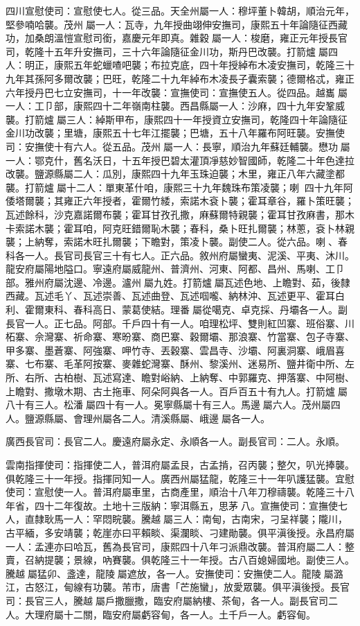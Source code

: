 \begin{pinyinscope}
四川宣慰使司：宣慰使七人。從三品。天全州屬一人：穆坪董卜韓胡，順治元年，堅參喃哈襲。茂州屬一人：瓦寺，九年授曲翊伸安撫司，康熙五十年論隨征西藏功，加桑朗溫愷宣慰司銜，嘉慶元年即真。雜穀屬一人：梭磨，雍正元年授長官司，乾隆十五年升安撫司，三十六年論隨征金川功，斯丹巴改襲。打箭爐屬四人：明正，康熙五年蛇蠟喳吧襲；布拉克底，四十年授綽布木凌安撫司，乾隆三十九年其孫阿多爾改襲；巴旺，乾隆二十九年綽布木凌長子囊索襲；德爾格忒，雍正六年授丹巴七立安撫司，十一年改襲：宣撫使司：宣撫使五人。從四品。越巂屬一人：工⼙部，康熙四十二年嶺南柱襲。西昌縣屬一人：沙麻，四十九年安鞏威襲。打箭爐屬三人：綽斯甲布，康熙四十一年授資立安撫司，乾隆四十年論隨征金川功改襲；里塘，康熙五十七年江擺襲；巴塘，五十八年羅布阿旺襲。安撫使司：安撫使十有六人。從五品。茂州屬一人：長寧，順治九年蘇廷輔襲。懋功屬一人：鄂克什，舊名沃日，十五年授巴碧太灌頂凈慈妙智國師，乾隆二十年色達拉改襲。鹽源縣屬二人：瓜別，康熙四十九年玉珠迫襲；木里，雍正八年六藏塗都襲。打箭爐屬十二人：單東革什咱，康熙三十九年魏珠布策凌襲；喇，四十九年阿倭塔爾襲；其雍正六年授者，霍爾竹緌，索諾木袞卜襲；霍耳章谷，羅卜策旺襲；瓦述餘科，沙克嘉諾爾布襲；霍耳甘孜孔撒，麻蘇爾特親襲；霍耳甘孜麻書，那木卡索諾木襲；霍耳咱，阿克旺錯爾恥木襲；春科，桑卜旺扎爾襲；林蔥，袞卜林親襲；上納奪，索諾木旺扎爾襲；下瞻對，策凌卜襲。副使二人。從六品。喇、春科各一人。長官司長官三十有七人。正六品。敘州府屬蠻夷、泥溪、平夷、沐川。龍安府屬陽地隘口。寧遠府屬威龍州、普濟州、河東、阿都、昌州、馬喇、工⼙部。雅州府屬沈邊、冷邊。瀘州屬九姓。打箭爐屬瓦述色地、上瞻對、茹，後隸西藏。瓦述毛丫、瓦述崇善、瓦述曲登、瓦述啯嚨、納林沖、瓦述更平、霍耳白利、霍爾東科、春科高日、蒙葛使結。理番屬從噶克、卓克採、丹壩各一人。副長官一人。正七品。阿部。千戶四十有一人。咱理松坪、雙則紅凹寨、班俗寨、川柘寨、佘灣寨、祈命寨、寒昐寨、商巴寨、穀爾壩、那浪寨、竹當寨、包子寺寨、甲多寨、墨蒼寨、阿強寨、呷竹寺、丟穀寨、雲昌寺、沙壩、阿裏洞寨、峨眉喜寨、七布寨、毛革阿按寨、麥雜蛇灣寨、酥州、黎溪州、迷易所、鹽井衛中所、左所、右所、古柏樹、瓦述寫達、瞻對峪納、上納奪、中郭羅克、押落寨、中阿樹、上瞻對、撒墩木期、古土拖車、阿朵阿與各一人。百戶百五十有九人。打箭爐屬八十有三人。松潘屬四十有一人。冕寧縣屬十有三人。馬邊屬六人。茂州屬四人。鹽源縣屬、會理州屬各二人。清溪縣屬、峨邊屬各一人。

廣西長官司：長官二人。慶遠府屬永定、永順各一人。副長官司：二人。永順。

雲南指揮使司：指揮使二人，普洱府屬孟艮，古孟掯，召丙襲；整欠，叭光捧襲。俱乾隆三十一年授。指揮同知一人。廣西州屬猛龍，乾隆三十一年叭護猛襲。宜慰使司：宣慰使一人。普洱府屬車里，古商產里，順治十八年刀穆禱襲。乾隆三十八年省，四十二年復故。土地十三版納：寧洱縣五，思茅八。宣撫使司：宣撫使七人，直隸耿馬一人：罕悶睆襲。騰越屬三人：南甸，古南宋，刁呈祥襲；隴川，古平緬，多安靖襲；乾崖亦曰平賴睒、渠瀾睒、刁建勛襲。俱平滇後授。永昌府屬一人：孟連亦曰哈瓦，舊為長官司，康熙四十八年刁派鼎改襲。普洱府屬二人：整賣，召納提襲；景線，吶賽襲。俱乾隆三十一年授。古八百媳婦國地。副使三人。騰越屬猛卯、盞達，龍陵屬遮放，各一人。安撫使司：安撫使二人。龍陵屬潞江，古怒江，甸線有功襲。芾市，唐書「芒施蠻」，放愛眾襲。俱平滇後授。長官司：長官三人，騰越屬戶撒臘撒，臨安府屬納樓、茶甸，各一人。副長官司二人。大理府屬十二關，臨安府屬虧容甸，各一人。土千戶一人。虧容甸。


\end{pinyinscope}
